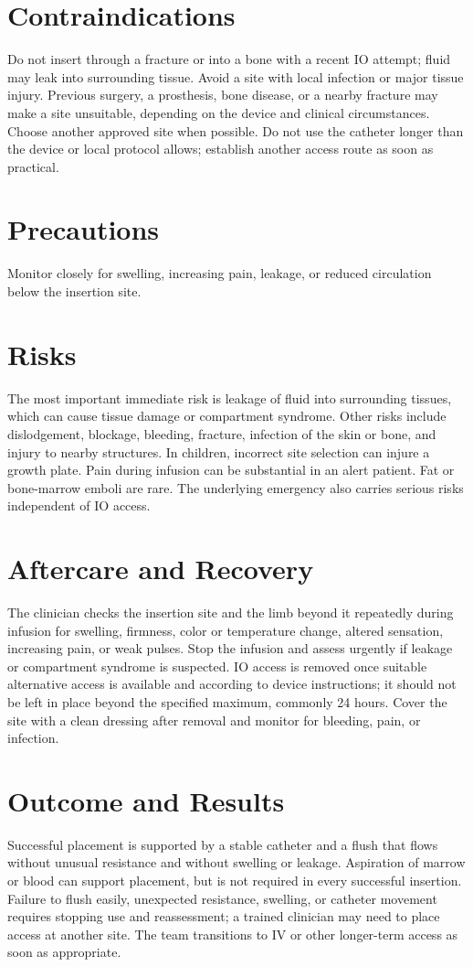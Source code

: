 \section*{Contraindications}
Do not insert through a fracture or into a bone with a recent IO attempt; fluid may leak into surrounding tissue. Avoid a site with local infection or major tissue injury. Previous surgery, a prosthesis, bone disease, or a nearby fracture may make a site unsuitable, depending on the device and clinical circumstances. Choose another approved site when possible. Do not use the catheter longer than the device or local protocol allows; establish another access route as soon as practical.

\section*{Precautions}
Monitor closely for swelling, increasing pain, leakage, or reduced circulation below the insertion site.

\section*{Risks}
The most important immediate risk is leakage of fluid into surrounding tissues, which can cause tissue damage or compartment syndrome. Other risks include dislodgement, blockage, bleeding, fracture, infection of the skin or bone, and injury to nearby structures. In children, incorrect site selection can injure a growth plate. Pain during infusion can be substantial in an alert patient. Fat or bone-marrow emboli are rare. The underlying emergency also carries serious risks independent of IO access.

\section*{Aftercare and Recovery}
The clinician checks the insertion site and the limb beyond it repeatedly during infusion for swelling, firmness, color or temperature change, altered sensation, increasing pain, or weak pulses. Stop the infusion and assess urgently if leakage or compartment syndrome is suspected. IO access is removed once suitable alternative access is available and according to device instructions; it should not be left in place beyond the specified maximum, commonly 24 hours. Cover the site with a clean dressing after removal and monitor for bleeding, pain, or infection.

\section*{Outcome and Results}
Successful placement is supported by a stable catheter and a flush that flows without unusual resistance and without swelling or leakage. Aspiration of marrow or blood can support placement, but is not required in every successful insertion. Failure to flush easily, unexpected resistance, swelling, or catheter movement requires stopping use and reassessment; a trained clinician may need to place access at another site. The team transitions to IV or other longer-term access as soon as appropriate.

